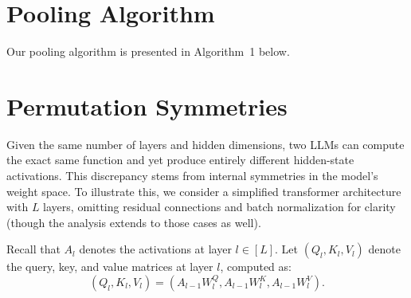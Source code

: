 \section{Pooling Algorithm}
\label{app:pool}

Our pooling algorithm is presented in Algorithm~1 below.

\begin{figure}[h]
\centering
{}
\end{figure}

\section{Permutation Symmetries}
\label{app:permutation}

Given the same number of layers and hidden dimensions, two LLMs can compute the exact same
function and yet produce entirely different hidden-state activations. This discrepancy stems from internal
symmetries in the model's weight space. To illustrate this, we consider a simplified transformer
architecture with $L$ layers, omitting residual connections and batch normalization for clarity (though
the analysis extends to those cases as well).

Recall that $A_l$ denotes the activations at layer $l \in [L]$. Let $(Q_l, K_l, V_l)$ denote the query, key, and
value matrices at layer $l$, computed as:
\begin{equation}
(Q_l, K_l, V_l) = (A_{l-1} W_l^{Q}, A_{l-1} W_l^{K}, A_{l-1} W_l^{V}).
\end{equation}

